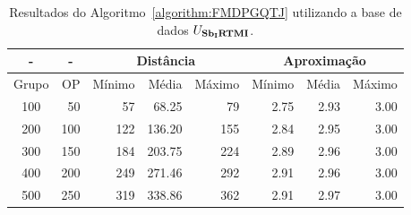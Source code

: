 \begin{table}[!htb]
  \caption{Resultados do Algoritmo~\ref{algorithm:FMDPGQTJ} utilizando a base de dados $U_{\textbf{Sb\textsubscript{I}RTMI}}{}$.}
  \label{table:EANTBRZP}
  \centering
  \begin{tabular}{|c|r|r|r|r|r|r|r|}
    \hline
      -      & \multicolumn{1}{c|}{-} & \multicolumn{3}{c|}{Distância}             & \multicolumn{3}{c|}{Aproximação}           \\ \hline
    Grupo    & OP                     & Mínimo       & Média        & Máximo       & Mínimo       & Média        & Máximo       \\ \hline  
    100      & 50                     & 57           &  68.25       & 79           & 2.75         & 2.93         & 3.00         \\ \hline
    200      & 100                    & 122          & 136.20       & 155          & 2.84         & 2.95         & 3.00         \\ \hline
    300      & 150                    & 184          & 203.75       & 224          & 2.89         & 2.96         & 3.00         \\ \hline
    400      & 200                    & 249          & 271.46       & 292          & 2.91         & 2.96         & 3.00         \\ \hline
    500      & 250                    & 319          & 338.86       & 362          & 2.91         & 2.97         & 3.00         \\ \hline    
  \end{tabular}
\end{table}